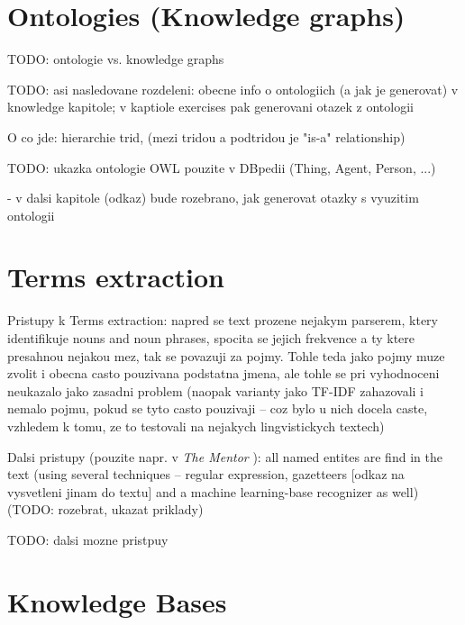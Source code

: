 \documentclass[a4paper, 12pt, twoside]{fithesis2}		%
\renewcommand{\_}{\leavevmode \kern0.0em\vbox{\hrule width0.4em}}
\begin{document}
\section{Ontologies (Knowledge graphs)}
\label{sec:ontologies}

TODO: ontologie vs. knowledge graphs

TODO: asi nasledovane rozdeleni: obecne info o ontologiich (a jak je generovat) v knowledge kapitole; v kaptiole exercises pak generovani otazek z ontologii

O co jde: hierarchie trid, (mezi tridou a podtridou je "is-a" relationship)

TODO: ukazka ontologie OWL pouzite v DBpedii (Thing, Agent, Person, ...)

- v dalsi kapitole (odkaz) bude rozebrano, jak generovat otazky s vyuzitim ontologii


\section{Terms extraction}
\label{sec:terms-extraction}

Pristupy k Terms extraction: napred se text prozene nejakym parserem, ktery identifikuje nouns and noun phrases, spocita se jejich frekvence a ty ktere presahnou nejakou mez, tak se povazuji za pojmy. Tohle teda jako pojmy muze zvolit i obecna casto pouzivana podstatna jmena, ale tohle se pri vyhodnoceni neukazalo jako zasadni problem (naopak varianty jako TF-IDF zahazovali i nemalo pojmu, pokud se tyto casto pouzivaji -- coz bylo u nich docela caste, vzhledem k tomu, ze to testovali na nejakych lingvistickych textech)
\cite{question-gen-mitkov}

Dalsi pristupy (pouzite napr. v \textit{The Mentor} \cite{mentor}): all named entites are find in the text
(using several techniques -- regular expression, gazetteers [odkaz na vysvetleni jinam do textu] and a machine learning-base recognizer as well) (TODO: rozebrat, ukazat priklady)

TODO: dalsi mozne pristpuy


\section{Knowledge Bases}
\label{sec:knowledge-bases}
\end{document}
